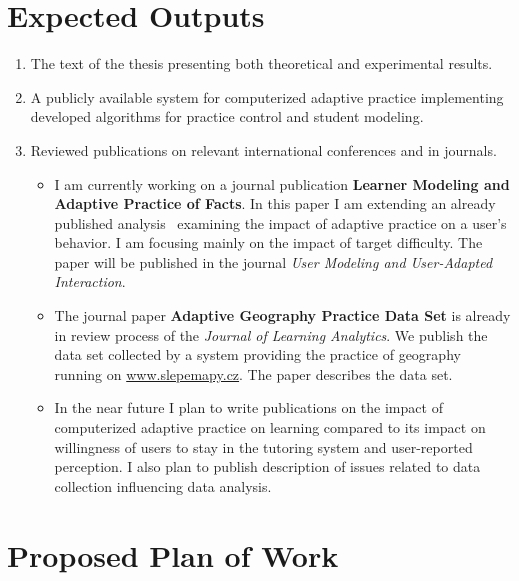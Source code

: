 \documentclass[table,color,cover,twoside,nolot,nolof]{fithesis3/fithesis3}
\begin{document}
\section{Expected Outputs}
\begin{enumerate}
	\item The text of the thesis presenting both theoretical and experimental
		results.
	\item A publicly available system for computerized adaptive practice
		implementing developed algorithms for practice control and student
		modeling.
	\item Reviewed publications on relevant international conferences and in
		journals.
		\begin{itemize}
			\item I am currently working on a journal publication
				\textbf{Learner Modeling and Adaptive Practice of Facts}. In this paper I
				am extending an already published analysis~\cite{papousek2015impact}
				examining the impact of adaptive practice on a user's behavior. I am
				focusing mainly on the impact of target difficulty. The paper will be
				published in the journal \emph{User Modeling and User-Adapted Interaction}.
			\item The journal paper \textbf{Adaptive Geography Practice Data Set} is
				already in review process of the \emph{Journal of Learning Analytics}.
				We publish the data set collected by a system providing
				the practice of geography running on \url{www.slepemapy.cz}.
				The paper describes the data set.
			\item In the near future I plan to write publications on the impact of computerized
				adaptive practice on learning compared to its impact on willingness of
				users to stay in the tutoring system and user-reported perception. I
				also plan to publish description of issues related to data collection
				influencing data analysis.
		\end{itemize}
\end{enumerate}



\section{Proposed Plan of Work}
\end{document}
